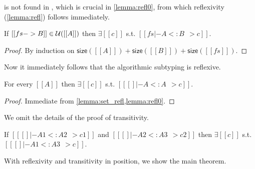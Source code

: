 \begin{remark}
   is not found in \citet{pierce1989decision}, which is
  crucial in \cref{lemma:refl0}, from which reflexivity (\cref{lemma:refl})
  follows immediately.
\end{remark}


\begin{lemma} \label{lemma:refl0}
  If $[[fs -> B]] \in \mathcal{U}([[A]])$ then $\exists [[c]]$ s.t. $[[fs |- A <: B ~~> c]]$.
\end{lemma}
\begin{proof}
  By induction on $\mathsf{size}([[A]]) + \mathsf{size}([[B]]) + \mathsf{size}([[fs]])$.
\end{proof}

Now it immediately follows that the algorithmic subtyping is reflexive.

\begin{lemma}[Reflexivity] \label{lemma:refl}
  For every $[[A]]$ then $\exists [[c]]$ s.t. $[[ [] |- A <: A ~~> c]]$.
\end{lemma}
\begin{proof}
  Immediate from \cref{lemma:set_refl,lemma:refl0}.
\end{proof}

We omit the details of the proof of transitivity.

\begin{lemma}[Transitivity] \label{lemma:trans}
  If $[[ [] |- A1 <: A2 ~~> c1]]$ and $[[ [] |- A2 <: A3 ~~> c2]]$ then $\exists
  [[c]]$ s.t. $[[ [] |- A1 <: A3 ~~> c]]$.
\end{lemma}

With reflexivity and transitivity in position, we show the main theorem.

